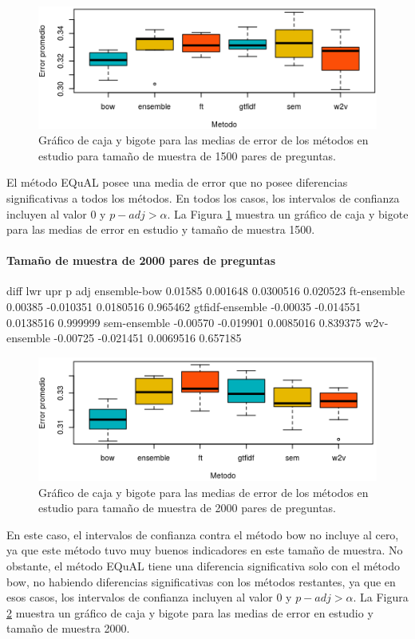\begin{figure}
	\centering
	\includegraphics[width=0.7\linewidth]{10_resultados/imagenes/anova_1500}
	\caption{Gráfico de caja y bigote para las medias de error de los métodos en estudio para tamaño de muestra de 1500 pares de preguntas.}
	\label{fig:anova1500}
\end{figure}

\bigskip El método EQuAL posee una media de error que no posee diferencias significativas a todos los métodos. En todos los casos, los intervalos de confianza incluyen al valor 0 y \(p-adj > \alpha\). La Figura \ref{fig:anova1500} muestra un gráfico de caja y bigote para las medias de error en estudio y tamaño de muestra 1500.

\bigskip
\paragraph{Tamaño de muestra de 2000 pares de preguntas}
\begin{rc}
                  diff       lwr       upr      p adj
ensemble-bow     0.01585  0.001648 0.0300516 0.020523
ft-ensemble      0.00385 -0.010351 0.0180516 0.965462
gtfidf-ensemble -0.00035 -0.014551 0.0138516 0.999999
sem-ensemble    -0.00570 -0.019901 0.0085016 0.839375
w2v-ensemble    -0.00725 -0.021451 0.0069516 0.657185
\end{rc}

\begin{figure}
	\centering
	\includegraphics[width=0.7\linewidth]{10_resultados/imagenes/anova_2000}
	\caption{Gráfico de caja y bigote para las medias de error de los métodos en estudio para tamaño de muestra de 2000 pares de preguntas.}
	\label{fig:anova2000}
\end{figure}

\bigskip En este caso, el intervalos de confianza contra el método bow no incluye al cero, ya que este método tuvo muy buenos indicadores en este tamaño de muestra. No obstante, el método EQuAL tiene una diferencia significativa solo con el método bow, no habiendo diferencias significativas con los métodos restantes, ya que en esos casos, los intervalos de confianza incluyen al valor \(0\) y \(p-adj > \alpha\). La Figura \ref{fig:anova2000} muestra un gráfico de caja y bigote para las medias de error en estudio y tamaño de muestra 2000.

